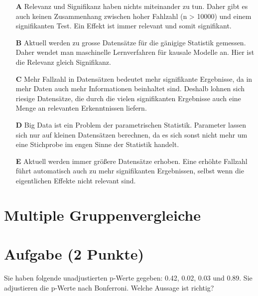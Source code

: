 \documentclass[a4paper, 9pt]{scrartcl}\usepackage[]{graphicx}\usepackage[]{xcolor}
\begin{document}
\begin{enumerate}
\item [\textbf{A} \msquare] Relevanz und Signifikanz haben nichts miteinander zu tun. Daher gibt es auch keinen Zusammenhang zwischen hoher Fahlzahl (n > 10000) und einem signifikanten Test. Ein Effekt ist immer relevant und somit signifikant.
\item [\textbf{B} \msquare] Aktuell werden zu grosse Datensätze für die gänigige Statistik gemessen. Daher wendet man maschinelle Lernverfahren für kausale Modelle an. Hier ist die Relevanz gleich Signifikanz.
\item [\textbf{C} \msquare] Mehr Fallzahl in Datensätzen bedeutet mehr signifikante Ergebnisse, da in mehr Daten auch mehr Informationen beinhaltet sind. Deshalb lohnen sich riesige Datensätze, die durch die vielen signifikanten Ergebnisse auch eine Menge an relevanten Erkenntnissen liefern.
\item [\textbf{D} \msquare] Big Data ist ein Problem der parametrischen Statistik. Parameter lassen sich nur auf kleinen Datensätzen berechnen, da es sich sonst nicht mehr um eine Stichprobe im engen Sinne der Statistik handelt.
\item [\textbf{E} \msquare] Aktuell werden immer größere Datensätze erhoben. Eine erhöhte Fallzahl führt automatisch auch zu mehr signifikanten Ergebnissen, selbst wenn die eigentlichen Effekte nicht relevant sind.
\end{enumerate}
\section*{Multiple Gruppenvergleiche}    

\section{Aufgabe \hfill (2 Punkte)}



Sie haben folgende unadjustierten p-Werte gegeben: 0.42, 0.02, 0.03 und 0.89. Sie adjustieren die p-Werte nach
Bonferroni. Welche Aussage ist richtig?
\end{document}

